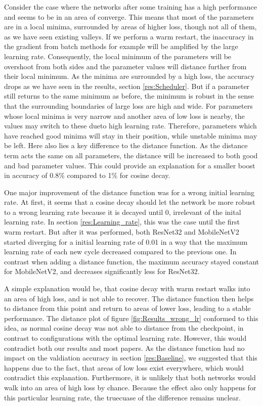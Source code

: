 Consider the case where the networks after some training has a high performance
and seems to be in an area of converge. This means that most of the parameters
are in a local minima, surrounded by areas of higher loss, though not all of
them, as we have seen existing valleys. If we perform a warm restart, the
inaccuracy in the gradient from batch methods for example will be amplified by
the large learning rate. Consequently, the local minimum of the parameters will
be overshoot from both sides and the parameter values will distance further from
their local minimum. As the minima are surrounded by a high loss, the accuracy
drops as we have seen in the results, section \ref{res:Scheduler}. But if a
parameter still returns to the same minimum as before, the minimum is robust in
the sense that the surrounding boundaries of large loss are high and wide. For
parameters whose local minima is very narrow and another area of low loss is
nearby, the values may switch to these dueto high learning rate. Therefore,
parameters which have reached good minima will stay in their position, while
unstable minima may be left. Here also lies a key difference to the distance
function. As the distance term acts the same on all parameters, the distance
will be increased to both good and bad parameter values. This could provide an
explanation for a smaller boost in accuracy of 0.8\% compared to 1\% for cosine
decay.
\newline

One major improvement of the distance function was for a wrong initial learning
rate. At first, it seems that a cosine decay should let the network be more
robust to a wrong learning rate because it is decayed until 0, irrelevant of the
inital learning rate. In section \ref{res:Learning_rate}, this was the case
until the first warm restart. But after it was performed, both ResNet32 and
MobileNetV2 started diverging for a initial learning rate of 0.01 in a way that
the maximum learning rate of each new cycle decreased compared to the previous
one. In contrast when adding a distance function, the maximum accuracy stayed
constant for MobileNetV2, and decreases significantly less for ResNet32.

A simple explanation would be, that cosine decay with warm restart walks into an
area of high loss, and is not able to recover. The distance function then helps
to distance from this point and return to areas of lower loss, leading to a
stable performance. The distance plot of figure \ref{fig:Results_wrong_lr}
conformed to this idea, as normal cosine decay was not able to distance from the
checkpoint, in contrast to configurations with the optimal learning rate.
However, this would contradict both our results and most papers. As the distance
function had no impact on the valdiation accuracy in section \ref{res:Baseline},
we suggested that this happens due to the fact, that areas of low loss exist
everywhere, which would contradict this explanation. Furthermore, it is unlikely
that both networks would walk into an area of high loss by chance. Because the
effect also only happens for this particular learning rate, the truecuase of the
difference remains unclear.
\newline

